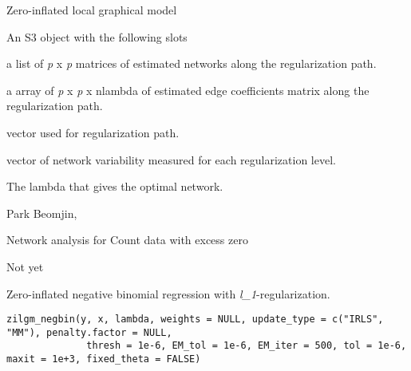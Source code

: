 \documentclass[a4paper]{book}
\begin{document}
%
\begin{Details}\relax
Zero-inflated local graphical model
\end{Details}
%
\begin{Value}
An S3 object with the following slots
\begin{ldescription}
\item[\code{network}] a list of \emph{p} x \emph{p} matrices of estimated networks along the regularization path.
\item[\code{coef\_network}] a array of \emph{p} x \emph{p} x nlambda of estimated edge coefficients matrix along the regularization path.
\item[\code{lambda}] vector used for regularization path.
\item[\code{v}] vector of network variability measured for each regularization level.
\item[\code{opt\_lambda}] The lambda that gives the optimal network.
\end{ldescription}
\end{Value}
%
\begin{Author}\relax
Park Beomjin, 
\end{Author}
%
\begin{References}\relax
Network analysis for Count data with excess zero
\end{References}
%
\begin{Examples}
\begin{ExampleCode}
Not yet
\end{ExampleCode}
\end{Examples}
%
\begin{Description}\relax
Zero-inflated negative binomial regression with \emph{l\_1}-regularization.
\end{Description}
%
\begin{Usage}
\begin{verbatim}
zilgm_negbin(y, x, lambda, weights = NULL, update_type = c("IRLS", "MM"), penalty.factor = NULL,
              thresh = 1e-6, EM_tol = 1e-6, EM_iter = 500, tol = 1e-6, maxit = 1e+3, fixed_theta = FALSE)
\end{verbatim}
\end{Usage}
%
\end{document}
